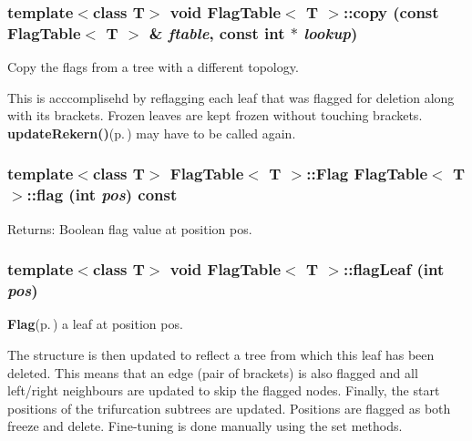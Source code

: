 \subsubsection{\setlength{\rightskip}{0pt plus 5cm}template$<$class T$>$ void {\bf Flag\-Table}$<$ T $>$::copy (const {\bf Flag\-Table}$<$ T $>$ \& {\em ftable}, const int $\ast$ {\em lookup})}\label{classFlagTable_a6}


Copy the flags from a tree with a different topology. 

This is acccomplisehd by reflagging each leaf that was flagged for deletion along with its brackets. Frozen leaves are kept frozen without touching brackets. {\bf update\-Rekern()}{\rm (p.\,\pageref{classFlagTable_a20})} may have to be called again. 
\subsubsection{\setlength{\rightskip}{0pt plus 5cm}template$<$class T$>$ {\bf Flag\-Table}$<$ T $>$::{\bf Flag} {\bf Flag\-Table}$<$ T $>$::flag (int {\em pos}) const\hspace{0.3cm}{\tt  [inline]}}\label{classFlagTable_a16}


\begin{Desc}
\item[Returns:]Boolean flag value at position pos. \end{Desc}
\subsubsection{\setlength{\rightskip}{0pt plus 5cm}template$<$class T$>$ void {\bf Flag\-Table}$<$ T $>$::flag\-Leaf (int {\em pos})}\label{classFlagTable_a10}


{\bf Flag}{\rm (p.\,\pageref{structFlagTable_1_1Flag})} a leaf at position pos. 

The structure is then updated to reflect a tree from which this leaf has been deleted. This means that an edge (pair of brackets) is also flagged and all left/right neighbours are updated to skip the flagged nodes. Finally, the start positions of the trifurcation subtrees are updated. Positions are flagged as both freeze and delete. Fine-tuning is done manually using the set methods. 
